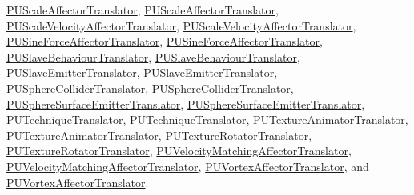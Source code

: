 \hyperlink{classPUScaleAffectorTranslator}{P\+U\+Scale\+Affector\+Translator}, \hyperlink{classPUScaleAffectorTranslator}{P\+U\+Scale\+Affector\+Translator}, \hyperlink{classPUScaleVelocityAffectorTranslator}{P\+U\+Scale\+Velocity\+Affector\+Translator}, \hyperlink{classPUScaleVelocityAffectorTranslator}{P\+U\+Scale\+Velocity\+Affector\+Translator}, \hyperlink{classPUSineForceAffectorTranslator}{P\+U\+Sine\+Force\+Affector\+Translator}, \hyperlink{classPUSineForceAffectorTranslator}{P\+U\+Sine\+Force\+Affector\+Translator}, \hyperlink{classPUSlaveBehaviourTranslator}{P\+U\+Slave\+Behaviour\+Translator}, \hyperlink{classPUSlaveBehaviourTranslator}{P\+U\+Slave\+Behaviour\+Translator}, \hyperlink{classPUSlaveEmitterTranslator}{P\+U\+Slave\+Emitter\+Translator}, \hyperlink{classPUSlaveEmitterTranslator}{P\+U\+Slave\+Emitter\+Translator}, \hyperlink{classPUSphereColliderTranslator}{P\+U\+Sphere\+Collider\+Translator}, \hyperlink{classPUSphereColliderTranslator}{P\+U\+Sphere\+Collider\+Translator}, \hyperlink{classPUSphereSurfaceEmitterTranslator}{P\+U\+Sphere\+Surface\+Emitter\+Translator}, \hyperlink{classPUSphereSurfaceEmitterTranslator}{P\+U\+Sphere\+Surface\+Emitter\+Translator}, \hyperlink{classPUTechniqueTranslator}{P\+U\+Technique\+Translator}, \hyperlink{classPUTechniqueTranslator}{P\+U\+Technique\+Translator}, \hyperlink{classPUTextureAnimatorTranslator}{P\+U\+Texture\+Animator\+Translator}, \hyperlink{classPUTextureAnimatorTranslator}{P\+U\+Texture\+Animator\+Translator}, \hyperlink{classPUTextureRotatorTranslator}{P\+U\+Texture\+Rotator\+Translator}, \hyperlink{classPUTextureRotatorTranslator}{P\+U\+Texture\+Rotator\+Translator}, \hyperlink{classPUVelocityMatchingAffectorTranslator}{P\+U\+Velocity\+Matching\+Affector\+Translator}, \hyperlink{classPUVelocityMatchingAffectorTranslator}{P\+U\+Velocity\+Matching\+Affector\+Translator}, \hyperlink{classPUVortexAffectorTranslator}{P\+U\+Vortex\+Affector\+Translator}, and \hyperlink{classPUVortexAffectorTranslator}{P\+U\+Vortex\+Affector\+Translator}.

